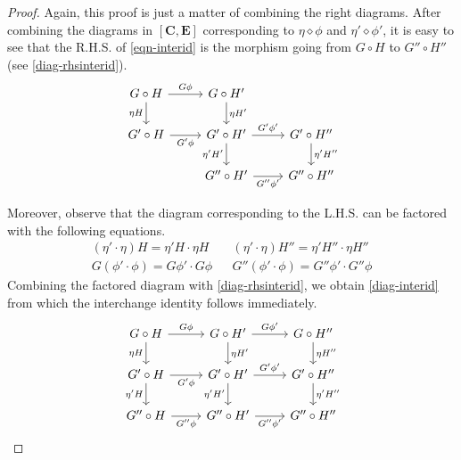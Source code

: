 \documentclass{article}
\theoremstyle{definition}
\theoremstyle{remark}
\begin{document}
\begin{proof}
	Again, this proof is just a matter of combining the right diagrams. After combining the diagrams in $[\mathbf{C},\mathbf{E}]$ corresponding to $\eta \diamond \phi$ and $\eta'\diamond \phi'$, it is easy to see that the R.H.S. of \eqref{eqn-interid} is the morphism going from $G\circ H$ to $G''\circ H''$ (see \eqref{diag-rhsinterid}).
	\begin{equation}\label{diag-rhsinterid}
	\begin{tikzcd}
	G\circ H \arrow[r, "G\phi"] \arrow[d, "\eta H"'] & G\circ H' \arrow[d, "\eta H'"]                       &                                  \\
	G'\circ H \arrow[r, "G'\phi"']                   & G'\circ H' \arrow[d, "\eta'H'"'] \arrow[r, "G'\phi'"] & G'\circ H'' \arrow[d, "\eta'H''"] \\
	& G''\circ H' \arrow[r, "G''\phi'"']                   & G''\circ H''                    
	\end{tikzcd}
	\end{equation}

	Moreover, observe that the diagram corresponding to the L.H.S. can be factored with the following equations.
	\begin{align*}
	(\eta'\cdot \eta)H = \eta'H\cdot \eta H && (\eta'\cdot \eta)H'' = \eta'H''\cdot \eta H''\\
	G(\phi'\cdot \phi) = G\phi'\cdot G\phi && G''(\phi'\cdot \phi) = G''\phi'\cdot G''\phi
	\end{align*}
	Combining the factored diagram with \eqref{diag-rhsinterid}, we obtain \eqref{diag-interid} from which the interchange identity follows immediately.
	\begin{equation}\label{diag-interid}
	\begin{tikzcd}
	G\circ H \arrow[r, "G\phi"] \arrow[d, "\eta H"']    & G\circ H' \arrow[d, "\eta H'"] \arrow[r, "G\phi'"]    & G\circ H'' \arrow[d, "\eta H''"]  \\
	G'\circ H \arrow[r, "G'\phi"'] \arrow[d, "\eta'H"'] & G'\circ H' \arrow[d, "\eta'H'"'] \arrow[r, "G'\phi'"] & G'\circ H'' \arrow[d, "\eta'H''"] \\
	G''\circ H \arrow[r, "G''\phi"']                     & G''\circ H' \arrow[r, "G''\phi'"']                    & G''\circ H''                     
	\end{tikzcd}
	\end{equation}
\end{proof}
\end{document}

